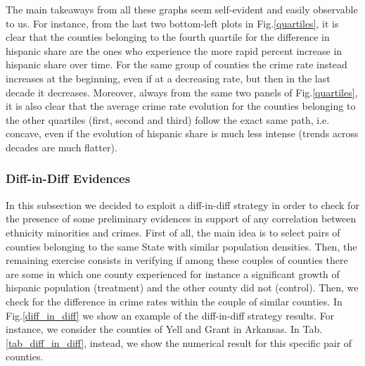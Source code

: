 \documentclass[a4paper,12pt]{article}
\begin{document}
\noindent
The main takeaways from all these graphs seem self-evident and easily observable to us. For instance, from the last two bottom-left plots in Fig.\ref{quartiles}, it is clear that the counties belonging to the fourth quartile for the difference in hispanic share are the ones who experience the more rapid percent increase in hispanic share over time. For the same group of counties the crime rate instead increases at the beginning, even if at a decreasing rate, but then in the last decade it decreases. Moreover, always from the same two panels of Fig.\ref{quartiles}, it is also clear that the average crime rate evolution for the counties belonging to the other quartiles (first, second and third) follow the exact same path, i.e. concave, even if the evolution of hispanic share is much less intense (trends across decades are much flatter).

\subsubsection{Diff-in-Diff Evidences}
In this subsection we decided to exploit a diff-in-diff strategy in order to check for the presence of some preliminary evidences in support of any correlation between ethnicity minorities and crimes. First of all, the main idea is to select pairs of counties belonging to the same State with similar population densities. Then, the remaining exercise consists in verifying if among these couples of counties there are some in which one county experienced for instance a significant growth of hispanic population (treatment) and the other county did not (control). Then, we check for the difference in crime rates within the couple of similar counties. In Fig.\ref{diff_in_diff} we show an example of the diff-in-diff strategy results. For instance, we consider the counties of Yell and Grant in Arkansas. In Tab.\ref{tab_diff_in_diff}, instead, we show the numerical result for this specific pair of counties.
\end{document}
